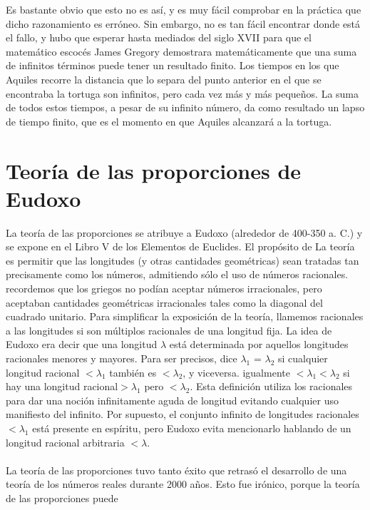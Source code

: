 \documentclass{book}
\begin{document}
    Es bastante obvio que esto no es así, y es muy fácil comprobar en la práctica que dicho 
    razonamiento es erróneo. Sin embargo, no es tan fácil encontrar donde está el fallo, 
    y hubo que esperar hasta mediados del siglo XVII para que el matemático escocés James Gregory 
    demostrara matemáticamente que una suma de infinitos términos puede tener un resultado finito. 
    Los tiempos en los que Aquiles recorre la distancia que lo separa del punto anterior en el que 
    se encontraba la tortuga son infinitos, pero cada vez más y más pequeños. La suma de todos estos 
    tiempos, a pesar de su infinito número, da como resultado un lapso de tiempo finito, 
    que es el momento en que Aquiles alcanzará a la tortuga.
    

    \section{Teoría de las proporciones de Eudoxo}
    La teoría de las proporciones se atribuye a Eudoxo (alrededor de 400-350 a. C.)
    y se expone en el Libro V de los Elementos de Euclides. El propósito de
    La teoría es permitir que las longitudes (y otras cantidades geométricas) sean tratadas
    tan precisamente como los números, admitiendo sólo el uso de números racionales.
    recordemos que los griegos no podían aceptar números irracionales, pero aceptaban cantidades 
    geométricas irracionales tales
    como la diagonal del cuadrado unitario. Para simplificar la exposición de la teoría,
    llamemos racionales a las longitudes si son múltiplos racionales de una longitud fija.
    La idea de Eudoxo era decir que una longitud $\lambda$ está determinada por aquellos
    longitudes racionales menores y mayores. Para ser precisos, dice
    $\lambda_{1}$ = $\lambda_{2}$ si cualquier longitud racional 
    $<\lambda_{1}$  también es $<\lambda_{2}$, y viceversa. igualmente
    $<\lambda_{1}<\lambda_{2}$ si hay una longitud racional$>\lambda_{1}$ pero $<\lambda_{2}$. 
    Esta definición utiliza
    los racionales para dar una noción infinitamente aguda de longitud evitando
    cualquier uso manifiesto del infinito. Por supuesto, el conjunto infinito de longitudes 
    racionales $<\lambda_{1}$
    está presente en espíritu, pero Eudoxo evita mencionarlo hablando de un
    longitud racional arbitraria $<\lambda$. \\ \\ 
    La teoría de las proporciones tuvo tanto éxito que retrasó el desarrollo de una teoría de los 
    números reales durante 2000 años. Esto fue irónico, porque la teoría de las proporciones puede 
\end{document}
